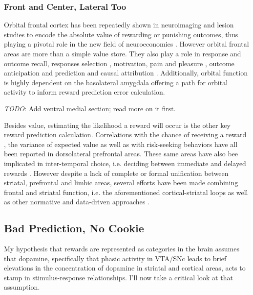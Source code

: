 \documentclass[doc,12pt]{apa}        %
\begin{document}
\subsubsection{Front and Center, Lateral Too}
\label{subsub:fclt}
Orbital frontal cortex has been repeatedly shown in neuroimaging \cite{ODoherty:2001p2423} and lesion \cite{Hornak:2004p6234} studies to encode the absolute value of rewarding or punishing outcomes, thus playing a pivotal role in the new field of neuroeconomics \cite{Glimcher:2005p863}.  However orbital frontal areas are more than a simple value store.  They also play a role in response and outcome recall, responses selection \cite{Rudebeck:2008p4712, Furuyashiki:2008p1631}, motivation, pain and pleasure \cite{Atlas:2010p7566}, outcome anticipation and prediction \cite{Tanaka:2006fk, Roesch:2007p7182} and causal attribution \cite{Tanaka:2008p3265}.  Additionally, orbital function is highly dependent on the basolateral amygdala \cite{ODoherty:2003p2616} offering a path for orbital activity to inform reward prediction error calculation.  

\emph{TODO}: Add ventral medial section; read more on it first.

Besides value, estimating the likelihood a reward will occur is the other key reward prediction calculation.  Correlations with the chance of receiving a reward \cite{Tobler:2009p8297}, the variance of expected value \cite{Kahnt:2010p7677} as well as with risk-seeking behaviors \cite{Tobler:2007p1562} have all been reported in dorsolateral prefrontal areas.  These same areas have also bee implicated in inter-temporal choice, i.e. deciding between immediate and delayed rewards \cite{Kim:2009p8304,Kim:2008p2984}.  However despite a lack of complete or formal unification between striatal, prefrontal and limbic areas, several efforts have been made combining frontal and striatal function, i.e. the aforementioned cortical-striatal loops \cite{Frank:2011p8152, Seger:2010p7189, Frank:2001p1996, Ashby:2007p8986} as well as other normative \cite{BarGad:2003p4052, Botvinick:2008p6594} and data-driven approaches \cite{Bogacz:2007p753}.


\subsection{Bad Prediction, No Cookie}
\label{sub:bad}
My hypothesis that rewards are represented as categories in the brain assumes that dopamine, specifically that phasic activity in VTA/SNc leads to brief elevations in the concentration of dopamine in striatal and cortical areas, acts to stamp in stimulus-response relationships.  I'll now take a critical look at that assumption.
\end{document}
